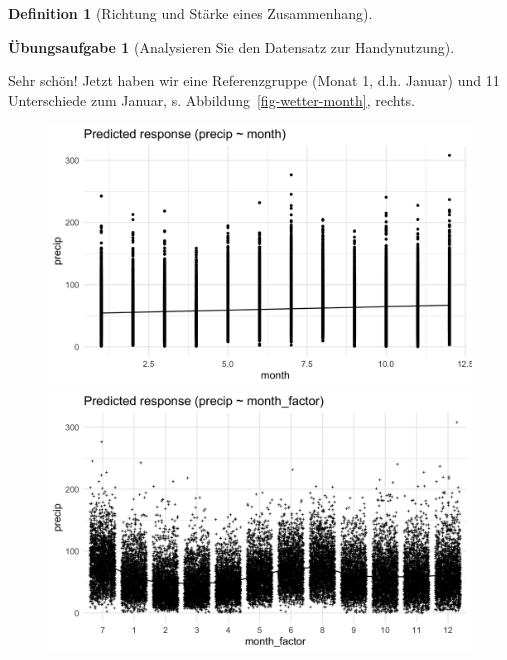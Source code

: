 \documentclass[
  a4paper,
  DIV=11]{scrreprt}
\theoremstyle{definition}
\newtheorem{exercise}{Übungsaufgabe}[chapter]
\theoremstyle{definition}
\theoremstyle{definition}
\newtheorem{definition}{Definition}[chapter]
\theoremstyle{remark}
\begin{document}
\begin{definition}[Richtung und Stärke eines
Zusammenhang]
\begin{exercise}[Analysieren Sie den Datensatz zur
Handynutzung]
\begin{longtable}[]
\end{longtable}

Sehr schön! Jetzt haben wir eine Referenzgruppe (Monat 1, d.h. Januar)
und 11 Unterschiede zum Januar, s. Abbildung~\ref{fig-wetter-month},
rechts.

\begin{figure}

\begin{minipage}{0.50\linewidth}

\includegraphics{img/fig-precip-month-num.png}

\end{minipage}%
%
\begin{minipage}{0.50\linewidth}

\includegraphics{img/fig-precip-month.png}

\end{minipage}%


\end{figure}
\end{exercise}
\end{definition}
\end{document}
